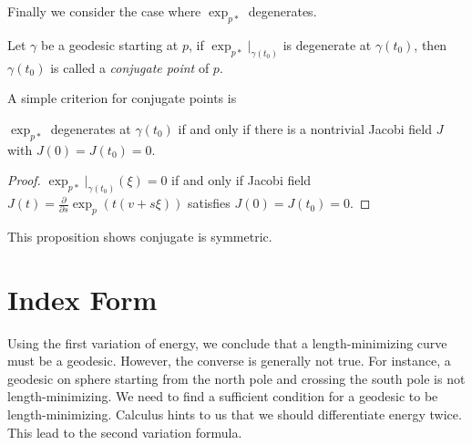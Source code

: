 Finally we consider the case where $\exp_{p*}$ degenerates.
\begin{defn}
    Let $\gamma$ be a geodesic starting at $p$, if $\exp_{p*}|_{\gamma(t_0)}$ is degenerate at $\gamma(t_0)$, then $\gamma(t_0)$ is called a \emph{conjugate point} of $p$.
\end{defn}

A simple criterion for conjugate points is
\begin{prop}
    $\exp_{p*}$ degenerates at $\gamma(t_0)$ if and only if there is a nontrivial Jacobi field $J$ with $J(0)=J(t_0)=0$.
\end{prop}
\begin{proof}
    $\exp_{p*}|_{\gamma(t_0)}(\xi)=0$ if and only if Jacobi field $J(t)=\frac{\partial{}}{\partial{s}}\exp_p(t(v+s\xi))$ satisfies $J(0)=J(t_0)=0$.
\end{proof}

\begin{rem}
    This proposition shows conjugate is symmetric.
\end{rem}

\section{Index Form}

Using the first variation of energy, we conclude that a length-minimizing curve must be a geodesic.
However, the converse is generally not true.
For instance, a geodesic on sphere starting from the north pole and crossing the south pole is not length-minimizing.
We need to find a sufficient condition for a geodesic to be length-minimizing.
Calculus hints to us that we should differentiate energy twice.
This lead to the second variation formula.


